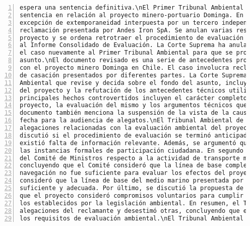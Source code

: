 \begin{Verbatim}[frame=lines, label=Elavoración propia -  Ejemplo de Contexto enviado por el Chatbot a OpenAI
				, fontsize=\scriptsize, numbers=left
				, baselinestretch=0.4
				, formatcom=\color{gray}]
espera una sentencia definitiva.\nEl Primer Tribunal Ambiental de Chile ha emitido una
sentencia en relación al proyecto minero-portuario Dominga. En la sentencia, se rechaza la
excepción de extemporaneidad interpuesta por un tercero independiente y se acoge la
reclamación presentada por Andes Iron SpA. Se anulan varias resoluciones relacionadas con el
proyecto y se ordena retrotraer el procedimiento de evaluación ambiental a una etapa posterior
al Informe Consolidado de Evaluación. La Corte Suprema ha anulado la sentencia y ha remitido
el caso nuevamente al Primer Tribunal Ambiental para que se pronuncie sobre el fondo del
asunto.\nEl documento revisado es una serie de antecedentes procesales de un caso relacionado
con el proyecto minero Dominga en Chile. El caso involucra reclamaciones judiciales y recursos
de casación presentados por diferentes partes. La Corte Suprema ha ordenado al Tribunal
Ambiental que revise y decida sobre el fondo del asunto, incluyendo la evaluación ambiental
del proyecto y la refutación de los antecedentes técnicos utilizados para rechazarlo. Los
principales hechos controvertidos incluyen el carácter completo de los antecedentes del
proyecto, la evaluación del mismo y los argumentos técnicos que fundamentaron su rechazo. El
documento también menciona la suspensión de la vista de la causa y la fijación de una nueva
fecha para la audiencia de alegatos.\nEl Tribunal Ambiental de Chile revisó una serie de
alegaciones relacionadas con la evaluación ambiental del proyecto Dominga. En primer lugar, se
discutió si el procedimiento de evaluación se terminó anticipadamente, concluyendo que no
existió falta de información relevante. Además, se argumentó que el proyecto cumplió con todas
las instancias formales de participación ciudadana. En segundo lugar, se analizó el criterio
del Comité de Ministros respecto a la actividad de transporte marítimo del proyecto,
concluyendo que el Comité consideró que la línea de base complementaria para las rutas de
navegación no fue suficiente para evaluar los efectos del proyecto. Sin embargo, el Tribunal
consideró que la línea de base del medio marino presentada por el titular del proyecto fue
suficiente y adecuada. Por último, se discutió la propuesta de la Casa del Mar, concluyendo
que el proyecto consideró compromisos voluntarios para cumplir con estándares más altos que
los establecidos por la legislación ambiental. En resumen, el Tribunal acogió algunas
alegaciones del reclamante y desestimó otras, concluyendo que el proyecto Dominga cumplió con
los requisitos de evaluación ambiental.\nEl Tribunal Ambiental ha revisado los argumentos

\end{Verbatim}
